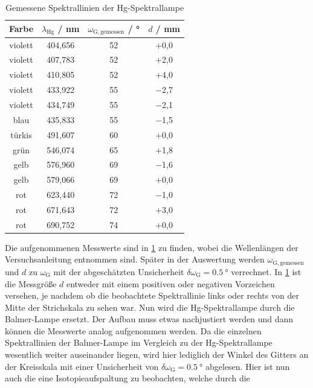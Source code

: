 \begin{table}[H]
    \centering
    \caption{Gemessene Spektrallinien der Hg-Spektrallampe}
    \begin{tabular}{c|c|c|c}
        Farbe & $\lambda_{\mathrm{Hg}}$ / \unit{\nano \meter} & $\omega_{\mathrm{G,gemessen}}$ / \unit{\degree} & $d$ / \unit{\milli \meter} \\
        \hline
        violett & 404,656 & 52 & $+$0,0 \\
        violett & 407,783 & 52 & $+$2,0 \\
        violett & 410,805 & 52 & $+$4,0 \\
        violett & 433,922 & 55 & $-$2,7 \\
        violett & 434,749 & 55 & $-$2,1 \\
        blau & 435,833 & 55 & $-$1,5 \\
        türkis & 491,607 & 60 & $+$0,0 \\
        grün & 546,074 & 65 & $+$1,8 \\
        gelb & 576,960 & 69 & $-$1,6 \\
        gelb & 579,066 & 69 & $+$0,0 \\
        rot & 623,440 & 72 & $-$1,0 \\
        rot & 671,643 & 72 & $+$3,0 \\
        rot & 690,752 & 74 & $+$0,0
    \end{tabular}\label{tab:spektrallinien_hg}
\end{table} Die aufgenommenen Messwerte sind in \cref{tab:spektrallinien_hg} zu finden, wobei die Wellenlängen der Versuchsanleitung \cite{skript} entnommen sind.
Später in der Auswertung werden $\omega_{\mathrm{G,gemessen}}$ und $d$ zu $\omega_{\mathrm{G}}$ mit der abgeschätzten Unsicherheit $\delta \omega_{\mathrm{G}} = \SI{0,5}{\degree}$ verrechnet.
In \cref{tab:spektrallinien_hg} ist die Messgröße $d$ entweder mit einem positiven oder negativen Vorzeichen versehen, je nachdem ob die beobachtete Spektrallinie links oder rechts
von der Mitte der Strichskala zu sehen war.\newline
\indent Nun wird die Hg-Spektrallampe durch die Balmer-Lampe ersetzt. Der Aufbau muss etwas nachjustiert werden und dann können die Messwerte analog aufgenommen werden.
Da die einzelnen Spektrallinien der Balmer-Lampe im Vergleich zu der Hg-Spektrallampe wesentlich weiter auseinander liegen, wird hier lediglich der Winkel des Gitters
an der Kreisskala mit einer Unsicherheit von $\delta \omega_{\mathrm{G}} = \SI{0,5}{\degree}$ abgelesen. Hier ist nun auch die eine Isotopieaufspaltung zu beobachten, welche durch die
